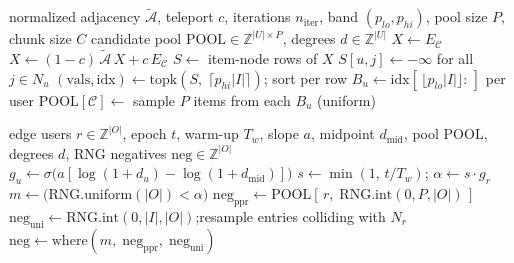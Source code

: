 \documentclass{article}
\begin{document}
\begin{algorithm}[t]
\caption{One-time PPR precompute and band extraction (per dataset)}
\label{alg:ppr}
\begin{algorithmic}[1]
\Require normalized adjacency $\tilde{\mathcal{A}}$, teleport $c$, iterations $n_{\mathrm{iter}}$,
band $(p_{lo},p_{hi})$, pool size $P$, chunk size $C$
\Ensure candidate pool $\mathrm{POOL}\in\mathbb{Z}^{|U|\times P}$, degrees $d\in\mathbb{Z}^{|U|}$
  \State $X \gets E_{\mathcal{C}}$ 
     \State $X \gets (1-c)\,\tilde{\mathcal{A}}\,X + c\,E_{\mathcal{C}}$ 
  \EndFor
  \State $S \gets$ item-node rows of $X$ 
  \State $S[u,j]\gets -\infty$ for all $j\in N_u$ 
  \State $(\mathrm{vals},\mathrm{idx})\gets \mathrm{topk}(S,\;\lceil p_{hi}|I|\rceil)$; sort per row
  \State $B_u \gets \mathrm{idx}[\,\lfloor p_{lo}|I|\rfloor:\,]$ per user 
  \State $\mathrm{POOL}[\mathcal{C}]\gets$ sample $P$ items from each $B_u$ (uniform)
\EndFor
\end{algorithmic}
\end{algorithm}

\begin{algorithm}[t]
\caption{S3 degree-gated curriculum negative sampling (per epoch, vectorized over all $|O|$ edges)}
\label{alg:sampler}
\begin{algorithmic}[1]
\Require edge users $r\in\mathbb{Z}^{|O|}$, epoch $t$, warm-up $T_w$, slope $a$,
midpoint $d_{\mathrm{mid}}$, pool $\mathrm{POOL}$, degrees $d$, RNG
\Ensure negatives $\mathrm{neg}\in\mathbb{Z}^{|O|}$
\State $g_u \gets \sigma\!\big(a[\log(1{+}d_u)-\log(1{+}d_{\mathrm{mid}})]\big)$ 
\State $s \gets \min(1,\,t/T_w)$; \quad $\alpha \gets s\cdot g_{r}$ 
\State $m \gets \big(\mathrm{RNG.uniform}(|O|) < \alpha\big)$ 
\State $\mathrm{neg}_{\mathrm{ppr}} \gets \mathrm{POOL}[\,r,\;\mathrm{RNG.int}(0,P,|O|)\,]$ 
\State $\mathrm{neg}_{\mathrm{uni}} \gets \mathrm{RNG.int}(0,|I|,|O|)$;\quad resample entries colliding with $N_r$
\State $\mathrm{neg} \gets \mathrm{where}(m,\;\mathrm{neg}_{\mathrm{ppr}},\;\mathrm{neg}_{\mathrm{uni}})$
\end{algorithmic}
\end{algorithm}
\end{document}
